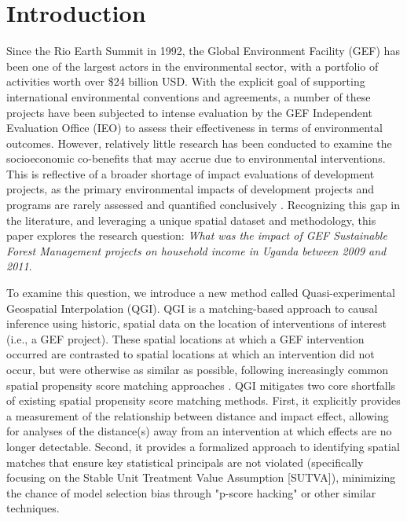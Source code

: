 \documentclass[sustainability,article,submit,moreauthors,pdftex]{Definitions/mdpi}
\begin{document}



\section{Introduction}
Since the Rio Earth Summit in 1992, the Global Environment Facility (GEF) has been one of the largest actors in the environmental sector, with a portfolio of activities worth over \$24 billion USD.  With the explicit goal of supporting international environmental conventions and agreements, a number of these projects have been subjected to intense evaluation by the GEF Independent Evaluation Office (IEO) to assess their effectiveness in terms of environmental outcomes. However, relatively little research has been conducted to examine the socioeconomic co-benefits that may accrue due to environmental interventions.  This is reflective of a broader shortage of impact evaluations of development projects, as the primary environmental impacts of development projects and programs are rarely assessed and quantified conclusively \cite{AlpizarTheRCTs}. Recognizing this gap in the literature, and leveraging a unique spatial dataset and methodology, this paper explores the research question:  \textit{What was the impact of GEF Sustainable Forest Management projects on household income in Uganda between 2009 and 2011}.  
\par
To examine this question, we introduce a new method called Quasi-experimental Geospatial Interpolation (QGI).  QGI is a matching-based approach to causal inference using historic, spatial data on the location of interventions of interest (i.e., a GEF project).  These spatial locations at which a GEF intervention occurred are contrasted to spatial locations at which an intervention did not occur, but were otherwise as similar as possible, following increasingly common spatial propensity score matching approaches \cite{Runfola2017wb, MalteUitto2018ImprovingAnalysis}.  QGI mitigates two core shortfalls of existing spatial propensity score matching methods. First, it explicitly provides a measurement of the relationship between distance and impact effect, allowing for analyses of the distance(s) away from an intervention at which effects are no longer detectable.  Second, it provides a formalized approach to identifying spatial matches that ensure key statistical principals are not violated (specifically focusing on the Stable Unit Treatment Value Assumption [SUTVA]), minimizing the chance of model selection bias through "p-score hacking" or other similar techniques.
\end{document}
